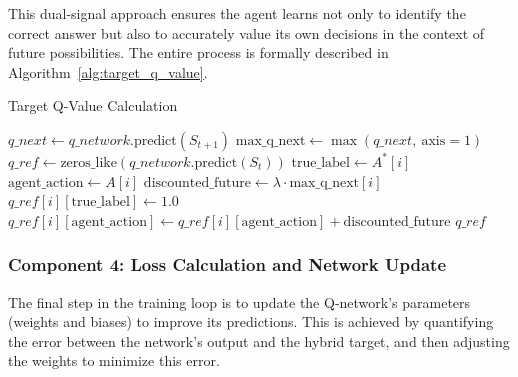 \documentclass{report}
\begin{document}
This dual-signal approach ensures the agent learns not only to identify the correct answer but also to accurately value its own decisions in the context of future possibilities. The entire process is formally described in Algorithm~\ref{alg:target_q_value}.

\begin{algorithm}[H]
\caption{Target Q-Value Calculation}
\label{alg:target_q_value}
\begin{algorithmic}[1]
    \State $q\_next \gets q\_network.\text{predict}(S_{t+1})$
    \State $\text{max\_q\_next} \gets \max(q\_next,\ \text{axis}=1)$
    \State $q\_ref \gets \text{zeros\_like}(q\_network.\text{predict}(S_t))$
        \State $\text{true\_label} \gets A^*[i]$
        \State $\text{agent\_action} \gets A[i]$
        \State $\text{discounted\_future} \gets \lambda \cdot \text{max\_q\_next}[i]$
        \State $q\_ref[i][\text{true\_label}] \gets 1.0$
        \State $q\_ref[i][\text{agent\_action}] \gets q\_ref[i][\text{agent\_action}] + \text{discounted\_future}$
    \EndFor
    \State \Return $q\_ref$
\EndFunction
\end{algorithmic}
\end{algorithm}

\subsubsection{Component 4: Loss Calculation and Network Update}

The final step in the training loop is to update the Q-network’s parameters (weights and biases) to improve its predictions. This is achieved by quantifying the error between the network’s output and the hybrid target, and then adjusting the weights to minimize this error.
\end{document}
